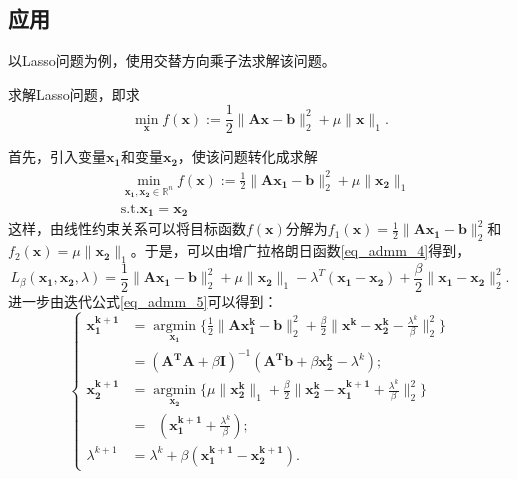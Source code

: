 \subsection{应用}

以Lasso问题为例，使用交替方向乘子法求解该问题。

\begin{problem}
    求解Lasso问题，即求
    \begin{equation}
        \mathop{\mathrm{min}}\limits_{\bm{x}} f(\bm{x}) := \frac{1}{2}\|\bm{A} \bm{x}-\bm{b}\|_{2}^{2} + \mu\|\bm{x}\|_{1}.
    \end{equation}
\end{problem}

\begin{solution}
    首先，引入变量$\bm{x_{1}}$和变量$\bm{x_{2}}$，使该问题转化成求解
    \begin{equation*}
        \begin{split}
            &\mathop{\mathrm{min}}\limits_{\bm{x_{1}, x_{2}}\in \mathbb{R}^{n}} f(\bm{x}) := \frac{1}{2}\|\bm{A} \bm{x_{1}}-\bm{b}\|_{2}^{2} + \mu\|\bm{x_{2}}\|_{1} \\
            &\mathrm{s. t.} \bm{x_{1}} = \bm{x_{2}}
        \end{split}
    \end{equation*}
    这样，由线性约束关系可以将目标函数$f(\bm{x})$分解为$f_{1}(\bm{x}) = \frac{1}{2}\|\bm{A} \bm{x_{1}}-\bm{b}\|_{2}^{2}$和$f_{2}(\bm{x}) = \mu\|\bm{x_{2}}\|_{1}$。于是，可以由增广拉格朗日函数\ref{eq_admm_4}得到，
    \begin{equation*}
        L_{\beta}(\bm{x_{1}}, \bm{x_{2}}, \lambda) = \frac{1}{2} \|\bm{Ax_{1}-b}\|_{2}^{2} + \mu \|\bm{x_{2}}\|_{1} - \lambda^{T}(\bm{x_{1}-x_{2}}) + \frac{\beta}{2} \|\bm{x_{1}-x_{2}}\|_{2}^{2}.
    \end{equation*}
    进一步由迭代公式\ref{eq_admm_5}可以得到：
    \begin{equation*}
        \begin{cases}
            \bm{x_{1}^{k+1}} &= \mathop{\mathrm{argmin}}\limits_{\bm{x_{1}}} \{ \frac{1}{2}\|\bm{Ax_{1}^{k}}-\bm{b}\|_{2}^{2} + \frac{\beta}{2}\|\bm{x^{k}} - \bm{x_{2}^{k}} -\frac{\lambda^{k}}{\beta}\|_{2}^{2} \} \\
                             &= (\bm{A^{T}A}+\beta\bm{I})^{-1}(\bm{A^{T}b} + \beta\bm{x_{2}^{k}} - \lambda^{k}) ; \\
            \bm{x_{2}^{k+1}} &= \mathop{\mathrm{argmin}}\limits_{\bm{x_{2}}} \{ \mu\|\bm{x_{2}^{k}}\|_{1} + \frac{\beta}{2} \|\bm{x_{2}^{k}}-\bm{x_{1}^{k+1}}+\frac{\lambda^{k}}{\beta}\|_{2}^{2}\} \\
                             &= \mathop{\mathrm{prox_{\frac{\mu}{\beta}\|\cdot\|_{1}}}}(\bm{x_{1}^{k+1}} + \frac{\lambda^{k}}{\beta}) ; \\
            \lambda^{k+1} &= \lambda^{k} + \beta(\bm{x_{1}^{k+1}-\bm{x_{2}^{k+1}}}).
        \end{cases}
    \end{equation*}


\end{solution}
